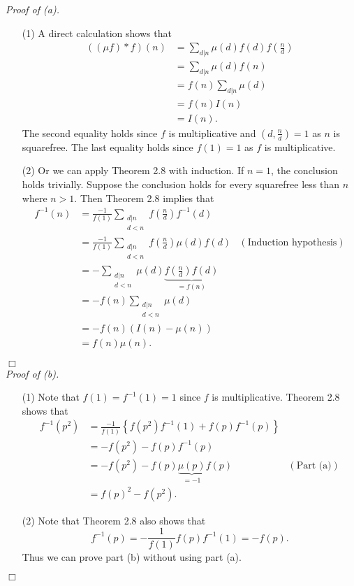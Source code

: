 \documentclass{article}
\begin{document}
\emph{Proof of (a).}
\begin{enumerate}
\item[(1)]
  A direct calculation shows that
  \begin{align*}
    ((\mu f) * f)(n)
    &= \sum_{d|n} \mu(d) f(d) f\left( \frac{n}{d} \right) \\
    &= \sum_{d|n} \mu(d) f(n) \\
    &= f(n) \sum_{d|n} \mu(d) \\
    &= f(n) I(n) \\
    &= I(n).
  \end{align*}
  The second equality holds since $f$ is multiplicative and
  $\left(d, \frac{n}{d} \right) = 1$ as $n$ is squarefree.
  The last equality holds since $f(1) = 1$ as $f$ is multiplicative.

\item[(2)]
  Or we can apply Theorem 2.8 with induction.
  If $n = 1$, the conclusion holds trivially.
  Suppose the conclusion holds for every squarefree less than $n$ where $n > 1$.
  Then Theorem 2.8 implies that
  \begin{align*}
    f^{-1}(n)
    &= \frac{-1}{f(1)} \sum_{\substack{d|n \\ d < n}} f\left(\frac{n}{d}\right) f^{-1}(d) \\
    &= \frac{-1}{f(1)} \sum_{\substack{d|n \\ d < n}} f\left(\frac{n}{d}\right) \mu(d)f(d)
      &(\text{Induction hypothesis}) \\
    &= - \sum_{\substack{d|n \\ d < n}} \mu(d)
        \underbrace{f\left(\frac{n}{d}\right) f(d)}_{= f(n)} \\
    &= -f(n) \sum_{\substack{d|n \\ d < n}} \mu(d) \\
    &= -f(n)(I(n) - \mu(n)) \\
    &= f(n)\mu(n).
  \end{align*}
\end{enumerate}
$\Box$ \\



\emph{Proof of (b).}
\begin{enumerate}
\item[(1)]
  Note that $f(1) = f^{-1}(1) = 1$ since $f$ is multiplicative.
  Theorem 2.8 shows that
  \begin{align*}
    f^{-1}(p^2)
    &= \frac{-1}{f(1)} \left\{ f(p^2)f^{-1}(1) + f(p)f^{-1}(p) \right\} \\
    &= - f(p^2) - f(p)f^{-1}(p) \\
    &= - f(p^2) - f(p) \underbrace{\mu(p)}_{= -1} f(p)
      &(\text{Part (a)}) \\
    &= f(p)^2 - f(p^2).
  \end{align*}

\item[(2)]
  Note that Theorem 2.8 also shows that
  \[
    f^{-1}(p) = - \frac{1}{f(1)} f(p) f^{-1}(1) = -f(p).
  \]
  Thus we can prove part (b) without using part (a).
\end{enumerate}
$\Box$ \\\\
\end{document}
